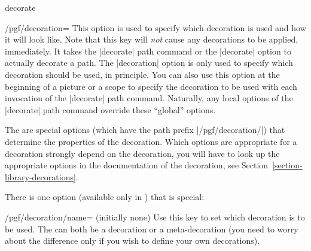 \begin{pathoperation}{decorate}{}
    \begin{key}{/pgf/decoration=}
        This option is used to specify which decoration is used and how it will
        look like. Note that this key will \emph{not} cause any decorations to
        be applied, immediately. It takes the |decorate| path command or the
        |decorate| option to actually decorate a path. The |decoration| option
        is only used to specify which decoration should be used, in principle.
        You can also use this option at the beginning of a picture or a scope
        to specify the decoration to be used with each invocation of the
        |decorate| path command. Naturally, any local options of the |decorate|
        path command override these ``global'' options.
\begin{codeexample}[preamble={\usetikzlibrary{
    decorations.pathmorphing,
    decorations.shapes,
}}]
\end{codeexample}

        The  are special options (which have the path
        prefix |/pgf/decoration/|) that determine the properties of the
        decoration. Which options are appropriate for a decoration strongly
        depend on the decoration, you will have to look up the appropriate
        options in the documentation of the decoration, see
        Section~\ref{section-library-decorations}.

        There is one option (available only in \tikzname) that is special:
        \begin{key}{/pgf/decoration/name= (initially none)}
            Use this key to set which decoration is to be used. The 
            can both be a decoration or a meta-decoration (you need to worry
            about the difference only if you wish to define your own
            decorations).


\end{key}
\end{key}
\end{pathoperation}

